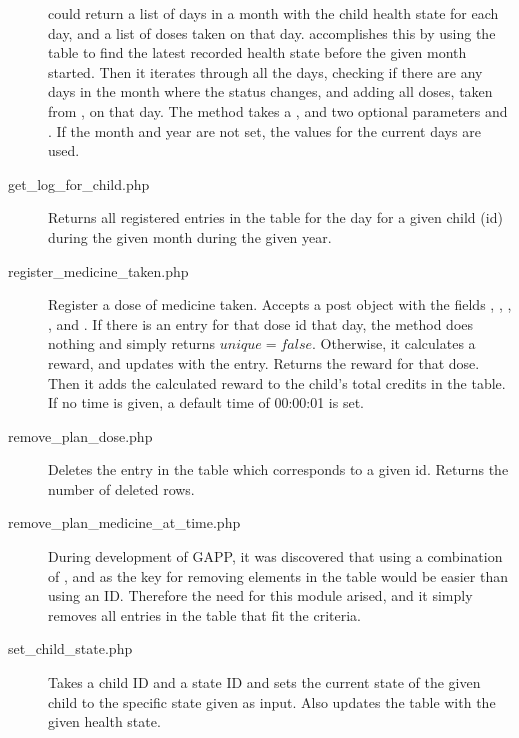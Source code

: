 \begin{description}
  		could return a list of days in a month with the child health state for each day, and a list of doses taken on that day. 
  		 accomplishes this by using the table  to find the latest recorded
  		health state before the given month started. Then it iterates through all the days, checking if there are any days in the month
  		where the status changes, and adding all doses, taken from , on that day. The method takes a ,
  		and two optional parameters  and . If the month and year are not set, the values for the current days
  		are used.
    \item[get\_log\_for\_child.php] Returns all registered entries in the table  for the day for a given child (id) 
    	during the given month during the given year.
    \item[register\_medicine\_taken.php] Register a dose of medicine taken. Accepts a post object with the fields , , 
    	, ,  and . If there is an entry for that dose id that day, the method does 
    	nothing and simply returns $unique=false$. Otherwise, it calculates a reward, and updates  with the entry. 
    	Returns the reward for that dose. Then it adds the calculated reward to the child's total credits in the  table. If 
  		no time is given, a default time of 00:00:01 is set.
    \item[remove\_plan\_dose.php] Deletes the entry in the table  which corresponds to a given id. Returns
  		the number of deleted rows.
    \item[remove\_plan\_medicine\_at\_time.php] During development of GAPP, it was discovered that using a
  		combination of ,  and  as the key for removing elements in the 
  		table would be easier than using an ID. Therefore the need for this module arised, and it simply removes all entries in the
  		table that fit the criteria.
    \item[set\_child\_state.php] Takes a child ID and a state ID and sets the current state of the given child to the specific state given as input. Also updates 
    	the table  with the given health state.
\end{description}
